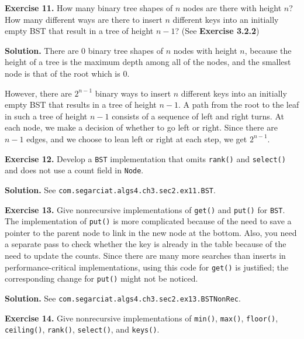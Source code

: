 \documentclass[12pt, a4paper]{article}
\newenvironment{ex}[2][Exercise]
{\par\medskip\noindent \textbf{#1 #2.}}
{\medskip}
\newenvironment{sol}[1][Solution]
{\par\medskip\noindent \textbf{#1.} }
{\medskip}
\begin{document}
	\begin{ex}{11}
		How many binary tree shapes of $n$ nodes are there with height $n$? How many different
		ways are there to insert $n$ different keys into an initially empty BST that result
		in a tree of height $n-1$? (See \textbf{Exercise 3.2.2})
	\end{ex}
	\begin{sol}
		There are 0 binary tree shapes of $n$ nodes with height $n$, because the height
		of a tree is the maximum depth among all of the nodes, and the smallest node
		is that of the root which is $0$.
		
		However, there are $2^{n-1}$ binary ways to insert $n$ different keys into an
		initially empty BST that results in a tree of height $n-1$. A path from the root
		to the leaf in such a tree of height $n-1$ consists of a sequence of left and right
		turns. At each node, we make a decision of whether to go left or right. Since there
		are $n-1$ edges, and we choose to lean left or right at each step, we get $2^{n-1}$.
	\end{sol}
	\begin{ex}{12}
		Develop a \texttt{BST} implementation that omits \texttt{rank()} and \texttt{select()}
		and does not use a count field in \texttt{Node}.
	\end{ex}
	\begin{sol}
		See \texttt{com.segarciat.algs4.ch3.sec2.ex11.BST}.
	\end{sol}
	\begin{ex}{13}
		Give nonrecursive implementations of \texttt{get()} and \texttt{put()} for \texttt{BST}.
		The implementation of \texttt{put()} is more complicated because of the need to save
		a pointer to the parent node to link in the new node at the bottom. Also, you need
		a separate pass to check whether the key is already in the table because of the need
		to update the counts. Since there are many more searches than inserts in performance-critical
		implementations, using this code for \texttt{get()} is justified; the corresponding change
		for \texttt{put()} might not be noticed.
	\end{ex}
	\begin{sol}
		See \texttt{com.segarciat.algs4.ch3.sec2.ex13.BSTNonRec}.
	\end{sol}
	\begin{ex}{14}
		Give nonrecursive implementations of \texttt{min()}, \texttt{max()}, \texttt{floor()},
		\texttt{ceiling()}, \texttt{rank()}, \texttt{select()}, and \texttt{keys()}.
	\end{ex}
\end{document}
